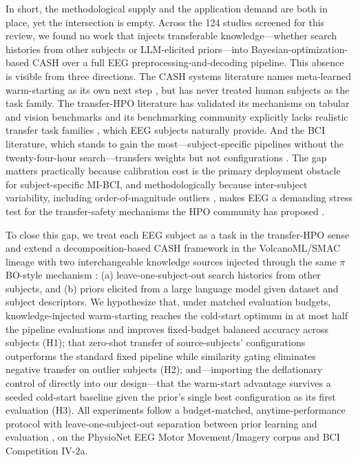 In short, the methodological supply and the application demand are both in place, yet the intersection is empty. Across the 124 studies screened for this review, we found no work that injects transferable knowledge---whether search histories from other subjects or LLM-elicited priors---into Bayesian-optimization-based CASH over a full EEG preprocessing-and-decoding pipeline. This absence is visible from three directions. The CASH systems literature names meta-learned warm-starting as its own next step \cite{LiEtAl2016, LiEtAl2020a, LiEtAl2022a}, but has never treated human subjects as the task family. The transfer-HPO literature has validated its mechanisms on tabular and vision benchmarks \cite{FeurerEtAl2015, HvarfnerEtAl2022, BaiEtAl2023} and its benchmarking community explicitly lacks realistic transfer task families \cite{EggenspergerEtAl2021}, which EEG subjects naturally provide. And the BCI literature, which stands to gain the most---subject-specific pipelines without the twenty-four-hour search---transfers weights but not configurations \cite{BerdyshevEtAl2024, ZhangEtAl2024}. The gap matters practically because calibration cost is the primary deployment obstacle for subject-specific MI-BCI, and methodologically because inter-subject variability, including order-of-magnitude outliers \cite{ZhangEtAl2024}, makes EEG a demanding stress test for the transfer-safety mechanisms the HPO community has proposed \cite{NomuraEtAl2021, HvarfnerEtAl2026}.


To close this gap, we treat each EEG subject as a task in the transfer-HPO sense and extend a decomposition-based CASH framework in the VolcanoML/SMAC lineage \cite{LiEtAl2021b, LindauerEtAl2021} with two interchangeable knowledge sources injected through the same $\pi$BO-style mechanism \cite{HvarfnerEtAl2022}: (a) leave-one-subject-out search histories from other subjects, and (b) priors elicited from a large language model given dataset and subject descriptors. We hypothesize that, under matched evaluation budgets, knowledge-injected warm-starting reaches the cold-start optimum in at most half the pipeline evaluations and improves fixed-budget balanced accuracy across subjects (H1); that zero-shot transfer of source-subjects' configurations outperforms the standard fixed pipeline while similarity gating eliminates negative transfer on outlier subjects (H2); and---importing the deflationary control of \cite{RodriguesEtAl2026} directly into our design---that the warm-start advantage survives a seeded cold-start baseline given the prior's single best configuration as its first evaluation (H3). All experiments follow a budget-matched, anytime-performance protocol with leave-one-subject-out separation between prior learning and evaluation \cite{EggenspergerEtAl2021, GijsbersEtAl2019}, on the PhysioNet EEG Motor Movement/Imagery corpus and BCI Competition IV-2a.

